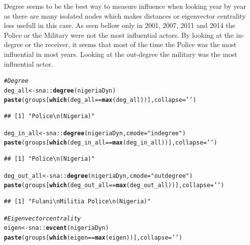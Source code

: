 \documentclass[12pt, letterpaper, notitlepage, onecolumn, twoside, openbib]{article}\usepackage[]{graphicx}\usepackage[]{color}
\makeatletter
\newcommand{\hlstr}[1]{\textcolor[rgb]{0.192,0.494,0.8}{#1}}%
\newcommand{\hlcom}[1]{\textcolor[rgb]{0.678,0.584,0.686}{\textit{#1}}}%
\newcommand{\hlopt}[1]{\textcolor[rgb]{0,0,0}{#1}}%
\newcommand{\hlstd}[1]{\textcolor[rgb]{0.345,0.345,0.345}{#1}}%
\newcommand{\hlkwb}[1]{\textcolor[rgb]{0.69,0.353,0.396}{#1}}%
\newcommand{\hlkwc}[1]{\textcolor[rgb]{0.333,0.667,0.333}{#1}}%
\newcommand{\hlkwd}[1]{\textcolor[rgb]{0.737,0.353,0.396}{\textbf{#1}}}%
\newenvironment{kframe}{%
 \def\at@end@of@kframe{}%
 \ifinner\ifhmode%
  \def\at@end@of@kframe{\end{minipage}}%
  \begin{minipage}{\columnwidth}%
 \fi\fi%
 \def\FrameCommand##1{\hskip\@totalleftmargin \hskip-\fboxsep
 \colorbox{shadecolor}{##1}\hskip-\fboxsep
     \hskip-\linewidth \hskip-\@totalleftmargin \hskip\columnwidth}%
 \MakeFramed {\advance\hsize-\width
   \@totalleftmargin\z@ \linewidth\hsize
   \@setminipage}}%
 {\par\unskip\endMakeFramed%
 \at@end@of@kframe}
\newenvironment{knitrout}{}{} %
\makeatother
\begin{document}
Degree seems to be the best way to measure influence when looking year by year as there are many isolated nodes which makes distances or eigenvector centrality less usefull in this case. As seen bellow only in 2001, 2007, 2011 and 2014 the Police or the Military were not the most influential actors. By looking at the in-degree or the receiver, it seems that most of the time the Police was the most influential in most years. Looking at the out-degree the military was the most influential actor.

\begin{knitrout}
\color{fgcolor}\begin{kframe}
\begin{alltt}
\hlcom{#Degree}
\hlstd{deg_all} \hlkwb{<-} \hlstd{sna}\hlopt{::}\hlkwd{degree}\hlstd{(nigeriaDyn)}
\hlkwd{paste}\hlstd{(groups[}\hlkwd{which}\hlstd{( deg_all} \hlopt{==} \hlkwd{max}\hlstd{(deg_all) )],} \hlkwc{collapse} \hlstd{=} \hlstr{' '}\hlstd{)}
\end{alltt}
\begin{verbatim}
## [1] "Police\n(Nigeria)"
\end{verbatim}
\begin{alltt}
\hlstd{deg_in_all} \hlkwb{<-} \hlstd{sna}\hlopt{::}\hlkwd{degree}\hlstd{(nigeriaDyn,} \hlkwc{cmode}\hlstd{=}\hlstr{"indegree"}\hlstd{)}
\hlkwd{paste}\hlstd{(groups[}\hlkwd{which}\hlstd{( deg_in_all} \hlopt{==} \hlkwd{max}\hlstd{(deg_in_all) )],} \hlkwc{collapse} \hlstd{=} \hlstr{' '}\hlstd{)}
\end{alltt}
\begin{verbatim}
## [1] "Police\n(Nigeria)"
\end{verbatim}
\begin{alltt}
\hlstd{deg_out_all} \hlkwb{<-} \hlstd{sna}\hlopt{::}\hlkwd{degree}\hlstd{(nigeriaDyn,} \hlkwc{cmode}\hlstd{=}\hlstr{"outdegree"}\hlstd{)}
\hlkwd{paste}\hlstd{(groups[}\hlkwd{which}\hlstd{( deg_out_all} \hlopt{==} \hlkwd{max}\hlstd{(deg_out_all) )],} \hlkwc{collapse} \hlstd{=} \hlstr{' '}\hlstd{)}
\end{alltt}
\begin{verbatim}
## [1] "Fulani\nMilitia Police\n(Nigeria)"
\end{verbatim}
\begin{alltt}
\hlcom{#Eigenvector centrality}
\hlstd{eigen} \hlkwb{<-} \hlstd{sna}\hlopt{::}\hlkwd{evcent}\hlstd{(nigeriaDyn)}
\hlkwd{paste}\hlstd{(groups[}\hlkwd{which}\hlstd{( eigen} \hlopt{==} \hlkwd{max}\hlstd{(eigen) )],} \hlkwc{collapse} \hlstd{=} \hlstr{' '}\hlstd{)}

\end{alltt}
\end{kframe}
\end{knitrout}
\end{document}
